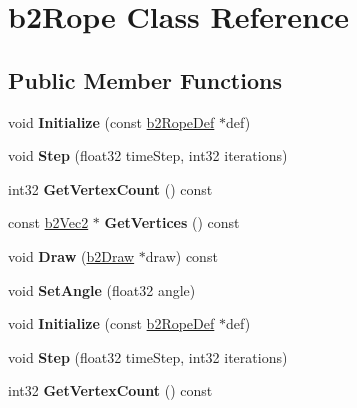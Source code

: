 \hypertarget{classb2Rope}{}\section{b2\+Rope Class Reference}
\label{classb2Rope}
\subsection*{Public Member Functions}
\begin{DoxyCompactItemize}
\item 
\mbox{\label{classb2Rope_a2a672ca3310790f4af1beb123e597d70}} 
void {\bfseries Initialize} (const \hyperlink{structb2RopeDef}{b2\+Rope\+Def} $\ast$def)
\item 
\mbox{\label{classb2Rope_abe9ce398cef717b136645cbc37f38d70}} 
void {\bfseries Step} (float32 time\+Step, int32 iterations)
\item 
\mbox{\label{classb2Rope_afdf6f7234dbf73fa83a058452e3d492a}} 
int32 {\bfseries Get\+Vertex\+Count} () const
\item 
\mbox{\label{classb2Rope_acf2b433c741b90b3668ff4477b4a8319}} 
const \hyperlink{structb2Vec2}{b2\+Vec2} $\ast$ {\bfseries Get\+Vertices} () const
\item 
\mbox{\label{classb2Rope_a9545f16b4ed203890a290d58ba56255c}} 
void {\bfseries Draw} (\hyperlink{classb2Draw}{b2\+Draw} $\ast$draw) const
\item 
\mbox{\label{classb2Rope_a8a1717a5e0b2c54d56fe438c8cae43b7}} 
void {\bfseries Set\+Angle} (float32 angle)
\item 
\mbox{\label{classb2Rope_a2a672ca3310790f4af1beb123e597d70}} 
void {\bfseries Initialize} (const \hyperlink{structb2RopeDef}{b2\+Rope\+Def} $\ast$def)
\item 
\mbox{\label{classb2Rope_abe9ce398cef717b136645cbc37f38d70}} 
void {\bfseries Step} (float32 time\+Step, int32 iterations)
\item 
\mbox{\label{classb2Rope_afdf6f7234dbf73fa83a058452e3d492a}} 
int32 {\bfseries Get\+Vertex\+Count} () const

\end{DoxyCompactItemize}
